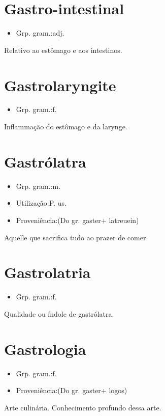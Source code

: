 \section{Gastro-intestinal}
\begin{itemize}
\item {Grp. gram.:adj.}
\end{itemize}
Relativo ao estômago e aos intestinos.
\section{Gastrolaryngite}
\begin{itemize}
\item {Grp. gram.:f.}
\end{itemize}
Inflammação do estômago e da larynge.
\section{Gastrólatra}
\begin{itemize}
\item {Grp. gram.:m.}
\end{itemize}
\begin{itemize}
\item {Utilização:P. us.}
\end{itemize}
\begin{itemize}
\item {Proveniência:(Do gr. \textunderscore gaster\textunderscore  + \textunderscore latreuein\textunderscore )}
\end{itemize}
Aquelle que sacrifica tudo ao prazer de comer.
\section{Gastrolatria}
\begin{itemize}
\item {Grp. gram.:f.}
\end{itemize}
Qualidade ou índole de gastrólatra.
\section{Gastrologia}
\begin{itemize}
\item {Grp. gram.:f.}
\end{itemize}
\begin{itemize}
\item {Proveniência:(Do gr. \textunderscore gaster\textunderscore  + \textunderscore logos\textunderscore )}
\end{itemize}
Arte culinária.
Conhecimento profundo dessa arte.
